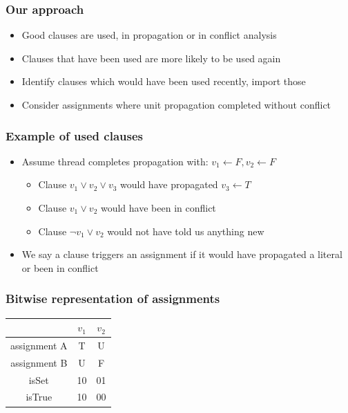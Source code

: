 \documentclass{beamer}
\begin{document}
\begin{frame}
\frametitle{Our approach}
\begin{itemize}
\item Good clauses are used, in propagation or in conflict analysis
\item Clauses that have been used are more likely to be used again
\item Identify clauses which would have been used recently, import those
\item Consider assignments where unit propagation completed without conflict
\end{itemize}
\end{frame}

\begin{frame}
\frametitle{Example of used clauses}
\begin{itemize}
\item Assume thread completes propagation with: $v_1 \leftarrow F, v_2 \leftarrow F$
\begin{itemize}
\item Clause $v_1 \lor v_2 \lor v_3$ would have propagated $ v_3 \leftarrow T$
\item Clause $v_1 \lor v_2$ would have been in conflict
\item Clause $\neg v_1 \lor v_2$ would not have told us anything new
\end{itemize}
\item We say a clause triggers an assignment if it would have propagated a literal or been in conflict
\end{itemize}
\end{frame}

\begin{frame}
\frametitle{Bitwise representation of assignments}

\begin{center}
\begin{tabular}{ | c | c | c |}
\hline
 & $v_1$ & $v_2$ \\ 
\hline
assignment A & T & U \\  
assignment B & U & F \\    
\hline
isSet & 10 & 01 \\
isTrue & 10 & 00 \\
\hline
\end{tabular}
\end{center}
\end{frame}
\end{document}
